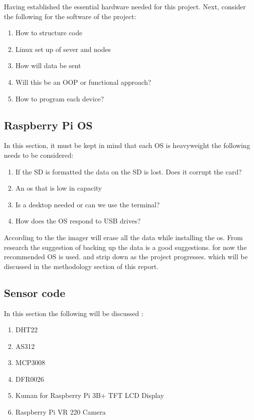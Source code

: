 
Having established the essential hardware needed for this project. Next, consider the following  for the software of the  project:
	\begin{enumerate}
	    \item How to structure code 
	    \item Linux set up of sever and nodes
	    \item How will data be sent
	    \item Will this be an OOP or functional approach?
	    \item How to program each device?
	\end{enumerate}
	\subsection{Raspberry Pi OS}
	\label{pi os}
	In this section, it must be kept in mind  that each OS is  heavyweight the following needs to be considered:
	\begin{enumerate}
		\item If the SD is formatted the  data on the SD is lost. Does it corrupt the card?
		\item An os that is low in capacity 
		\item Is a desktop needed or can we use the  terminal?
		\item How does  the OS  respond to USB drives?
	\end{enumerate}

	According to the \cite{projects} the imager will erase all the data while installing the os. From research  the suggestion of backing up the data is  a  good suggestions.
	for now the recommended OS is used. and  strip down as the project progresses. which will be  discussed  in the methodology section of this report.
	
	\subsection{Sensor code}
	In this section the following will be discussed :
	\begin{enumerate}
		\item DHT22
		\item AS312
		\item MCP3008
		\item DFR0026
		\item Kuman for Raspberry Pi 3B+ TFT LCD Display
		\item Raspberry Pi VR 220 Camera 
	\end{enumerate}

